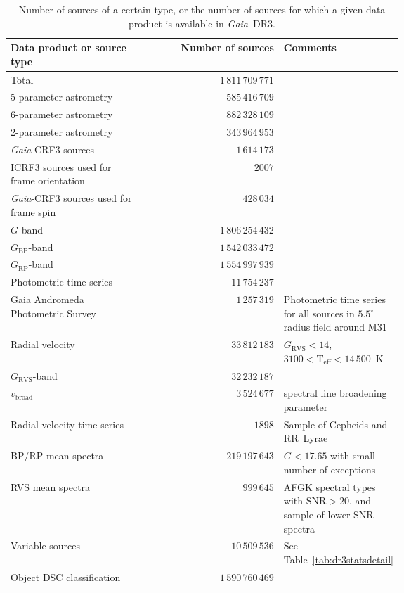 \documentclass[longauth]{aa}
\providecommand{\teff}{\ensuremath{{\mathrm{T_{eff}}}}\xspace}
\providecommand\gmag{\ensuremath{G}\xspace}
\providecommand\gbp{\ensuremath{G_\mathrm{BP}}\xspace}
\providecommand\grp{\ensuremath{G_\mathrm{RP}}\xspace}
\providecommand\grvs{\ensuremath{G_\mathrm{RVS}}\xspace}
\newcommand\gaia{\textit{Gaia}\xspace}
\providecommand\gdr[1]{\textit{Gaia}~DR#1\xspace}
\providecommand\tabref[1]{Table~\ref{#1}}
\newcommand\gdrthreetotal{\ensuremath{1\,811\,709\,771}\xspace}
\newcommand\gdrthreefiveptot{\ensuremath{585\,416\,709}\xspace}
\newcommand\gdrthreesixptot{\ensuremath{882\,328\,109}\xspace}
\newcommand\gdrthreetwoptot{\ensuremath{343\,964\,953}\xspace}
\newcommand\gdrthreegcrftot{\ensuremath{1\,614\,173}\xspace}
\newcommand\gdrthreeicrfused{\ensuremath{2007}\xspace}
\newcommand\gdrthreespinused{\ensuremath{428\,034}\xspace}
\newcommand\gdrthreewithgtot{\ensuremath{1\,806\,254\,432}\xspace}
\newcommand\gdrthreewithbptot{\ensuremath{1\,542\,033\,472}\xspace}
\newcommand\gdrthreewithrptot{\ensuremath{1\,554\,997\,939}\xspace}
\newcommand\gdrthreevradtot{\ensuremath{33\,812\,183}\xspace}
\newcommand\gdrthreegrvstot{\ensuremath{32\,232\,187}\xspace}
\newcommand\gdrthreevbroadtot{\ensuremath{3\,524\,677}\xspace}
\newcommand\gdrthreeepochrvtot{\ensuremath{1898}\xspace}
\newcommand{\gdrthreexpspectratot}{\ensuremath{219\,197\,643}\xspace}
\newcommand{\gdrthreervsspectratot}{\ensuremath{999\,645}\xspace}
\newcommand{\gdrthreevaritot}{\ensuremath{10\,509\,536}\xspace}
\newcommand{\gdrthreephottimeseries}{\ensuremath{11\,754\,237}\xspace}
\newcommand{\gdrthreegaps}{\ensuremath{1\,257\,319}\xspace}
\newcommand{\gdrthreedsc}{\ensuremath{1\,590\,760\,469}\xspace}
\begin{document}
\begin{table}[t!]
  \caption{Number of sources of a certain type, or the number of sources for which a given data product is available in \gdr{3}.}
  \label{tab:dr3stats}
  \centering
  \begin{tabular}{>{\raggedright}p{0.35\linewidth}r>{\raggedright\arraybackslash}p{0.3\linewidth}}
    \hline\hline
    Data product or source type & Number of sources & Comments\\
    \hline
    Total & \gdrthreetotal \\
    5-parameter astrometry & \gdrthreefiveptot \\
    6-parameter astrometry & \gdrthreesixptot \\
    2-parameter astrometry & \gdrthreetwoptot \\
    \gaia-CRF3 sources & \gdrthreegcrftot & \\
    ICRF3 sources used for frame orientation &  \gdrthreeicrfused & \\
    \gaia-CRF3 sources used for frame spin & \gdrthreespinused & \\
    $G$-band & \gdrthreewithgtot \\
    \gbp-band & \gdrthreewithbptot \\
    \grp-band & \gdrthreewithrptot \\
    Photometric time series & \gdrthreephottimeseries \\
    Gaia Andromeda Photometric Survey & \gdrthreegaps & Photometric time series for all sources in $5.5^\circ$ radius field around M31\\
    Radial velocity & \gdrthreevradtot & $\grvs<14$, $3100<\teff<14\,500$~K\\
    \grvs-band & \gdrthreegrvstot \\
    $v_\mathrm{broad}$ & \gdrthreevbroadtot & spectral line broadening parameter \\
    Radial velocity time series & \gdrthreeepochrvtot & Sample of Cepheids and RR~Lyrae \\
    BP/RP mean spectra & \gdrthreexpspectratot & $\gmag<17.65$ with small number of exceptions\\
    RVS mean spectra & \gdrthreervsspectratot & AFGK spectral types with $\mathrm{SNR}>20$, and sample of lower SNR spectra \\
    Variable sources & \gdrthreevaritot & See \tabref{tab:dr3statsdetail} \\
    Object  DSC classification  & \gdrthreedsc & \\

\end{tabular}
\end{table}
\end{document}
